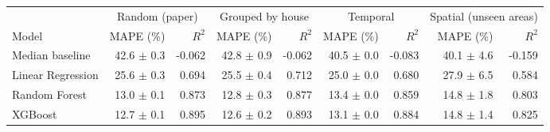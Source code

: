 \setlength{\tabcolsep}{4pt}
\begin{tabular}{lrrrrrrrr}
\hline
 & \multicolumn{2}{c}{Random (paper)} & \multicolumn{2}{c}{Grouped by house} & \multicolumn{2}{c}{Temporal} & \multicolumn{2}{c}{Spatial (unseen areas)} \\
Model & MAPE (\%) & $R^2$ & MAPE (\%) & $R^2$ & MAPE (\%) & $R^2$ & MAPE (\%) & $R^2$ \\
\hline
Median baseline & 42.6 $\pm$ 0.3 & -0.062 & 42.8 $\pm$ 0.9 & -0.062 & 40.5 $\pm$ 0.0 & -0.083 & 40.1 $\pm$ 4.6 & -0.159 \\
Linear Regression & 25.6 $\pm$ 0.3 & 0.694 & 25.5 $\pm$ 0.4 & 0.712 & 25.0 $\pm$ 0.0 & 0.680 & 27.9 $\pm$ 6.5 & 0.584 \\
Random Forest & 13.0 $\pm$ 0.1 & 0.873 & 12.8 $\pm$ 0.3 & 0.877 & 13.4 $\pm$ 0.0 & 0.859 & 14.8 $\pm$ 1.8 & 0.803 \\
XGBoost & 12.7 $\pm$ 0.1 & 0.895 & 12.6 $\pm$ 0.2 & 0.893 & 13.1 $\pm$ 0.0 & 0.884 & 14.8 $\pm$ 1.4 & 0.825 \\
\hline
\end{tabular}
